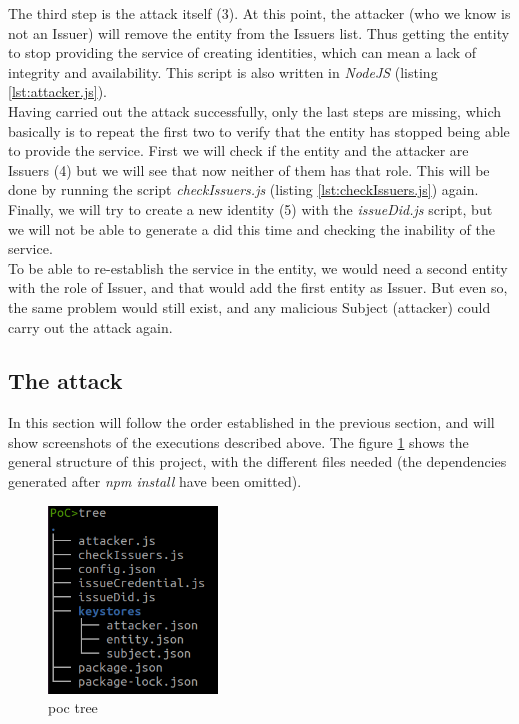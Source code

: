 \documentclass[a4paper, 12pt]{article} %
\begin{document}
        The third step is the attack itself (3). At this point, the attacker (who we know is not an Issuer) will remove the entity from the Issuers list. Thus getting the entity to stop providing the service of creating identities, which can mean a lack of integrity and availability. This script is also written in \textit{NodeJS} (listing \ref{lst:attacker.js}).\\
        
        
        Having carried out the attack successfully, only the last steps are missing, which basically is to repeat the first two to verify that the entity has stopped being able to provide the service. First we will check if the entity and the attacker are Issuers (4) but we will see that now neither of them has that role. This will be done by running the script \textit{checkIssuers.js} (listing \ref{lst:checkIssuers.js}) again. \\
        
        Finally, we will try to create a new identity (5) with the \textit{issueDid.js} script, but we will not be able to generate a \acrshort{did} this time and checking the inability of the service.\\
        
        To be able to re-establish the service in the entity, we would need a second entity with the role of Issuer, and that would add the first entity as Issuer. But even so, the same problem would still exist, and any malicious Subject (attacker) could carry out the attack again.
        
    \subsection{The attack}
        In this section will follow the order established in the previous section, and will show screenshots of the executions described above. The figure \ref{fig:poc-tree} shows the general structure of this project, with the different files needed (the dependencies generated after \textit{npm install} have been omitted).\\
        \begin{figure}[h]
            \centering
            \includegraphics[width=0.4\textwidth]{poc/tree.png}
            \caption{\acrshort{poc} tree}
            \label{fig:poc-tree}
        \end{figure}
        
\end{document}

